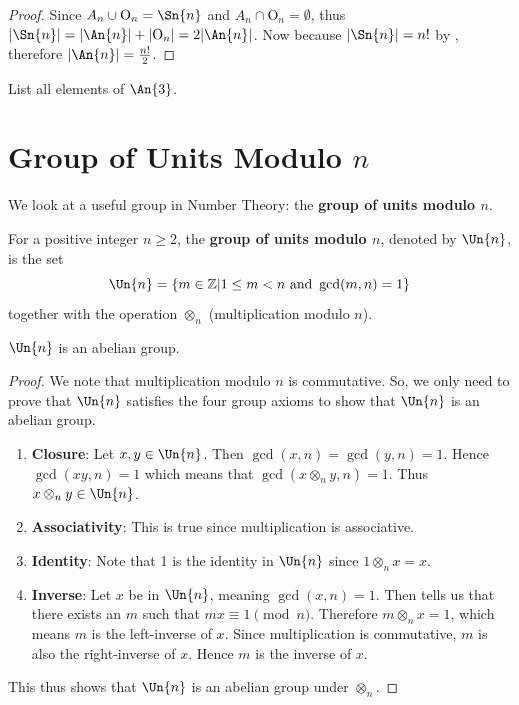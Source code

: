 \begin{proof}
    Since $A_n \cup \mathrm{O}_n = \Sn{n}$ and $A_n \cap \mathrm{O}_n = \emptyset$, thus $|\Sn{n}| = |\An{n}| + |\mathrm{O}_n| = 2|\An{n}|$. Now because $|\Sn{n}| = n!$ by , therefore $|\An{n}| = \frac{n!}2$.
\end{proof}

\begin{exercise}
    List all elements of $\An{3}$.
\end{exercise}

\section{Group of Units Modulo \texorpdfstring{$n$}{n}}
We look at a useful group in Number Theory: the \textbf{group of units modulo $n$}.

\begin{definition}
    For a positive integer $n \geq 2$, the \textbf{group of units modulo $n$}, denoted by $\Un{n}$, is the set
    \[
        \Un{n} = \{m \in \mathbb{Z} \vert 1 \leq m < n \text{ and } \gcd(m, n) = 1\}
    \]
    together with the operation $\otimes_n$ (multiplication modulo $n$).
\end{definition}

\begin{proposition}
    $\Un{n}$ is an abelian group.
\end{proposition}
\begin{proof}
    We note that multiplication modulo $n$ is commutative. So, we only need to prove that $\Un{n}$ satisfies the four group axioms to show that $\Un{n}$ is an abelian group.
    \begin{enumerate}
        \item \textbf{Closure}: Let $x, y \in \Un{n}$. Then $\gcd(x, n) = \gcd(y, n) = 1$. Hence $\gcd(xy, n) = 1$ which means that $\gcd(x\otimes_ny,n)=1$. Thus $x\otimes_ny \in \Un{n}$.
        
        \item \textbf{Associativity}: This is true since multiplication is associative.
        
        \item \textbf{Identity}: Note that 1 is the identity in $\Un{n}$ since $1 \otimes_n x = x$.
        
        \item \textbf{Inverse}: Let $x$ be in $\Un{n}$, meaning $\gcd(x, n) = 1$. Then  tells us that there exists an $m$ such that $mx \equiv 1 \pmod n$. Therefore $m \otimes_n x = 1$, which means $m$ is the left-inverse of $x$. Since multiplication is commutative, $m$ is also the right-inverse of $x$. Hence $m$ is the inverse of $x$.
    \end{enumerate}
    This thus shows that $\Un{n}$ is an abelian group under $\otimes_n$.
\end{proof}

